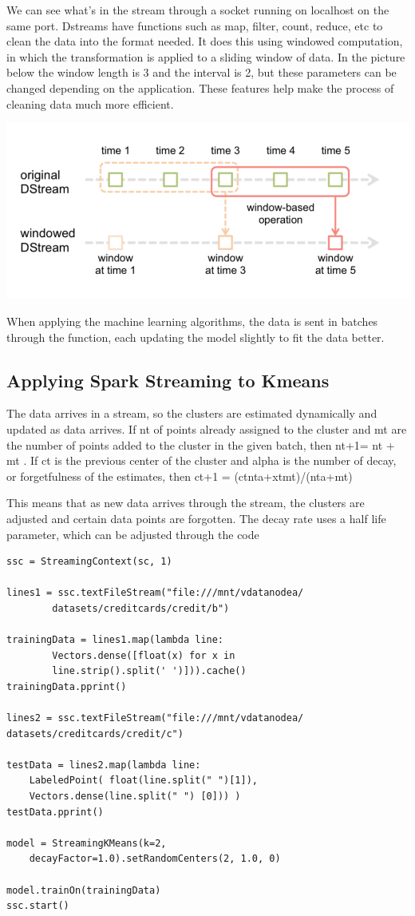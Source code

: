 \documentclass[9pt,twocolumn,twoside]{idsi}
\begin{document}
We can see what's in the stream  through a socket running on localhost on the same port. Dstreams have functions such as map, filter, count, reduce, etc to clean the data into the format needed. It does this using windowed computation, in which the transformation is applied to a sliding window of data. In the picture below the window length is 3 and the interval is 2, but these parameters can be changed depending on the application. These features help make the process of cleaning data much more efficient. 

\includegraphics[scale=0.5]{one.png}

When applying the machine learning algorithms, the data is sent in batches through the function, each updating the model slightly to fit the data better. 


\subsection{Applying Spark Streaming to Kmeans} 

The data arrives in a stream, so the clusters are estimated dynamically and updated as data arrives. If nt  of points already assigned to the cluster and mt  are the number of points added to the cluster in the given batch, then nt+1= nt + mt  . If ct  is the previous center of the cluster and alpha is the number of decay, or forgetfulness of the estimates, then ct+1 = (ctnta+xtmt)/(nta+mt)

This means that as new data arrives through the stream, the clusters are adjusted and certain data points are forgotten. The decay rate uses a half life parameter, which can be adjusted through the code

\begin{verbatim}
ssc = StreamingContext(sc, 1)

lines1 = ssc.textFileStream("file:///mnt/vdatanodea/
		datasets/creditcards/credit/b")
        
trainingData = lines1.map(lambda line: 
		Vectors.dense([float(x) for x in 
    	line.strip().split(' ')])).cache()
trainingData.pprint()

lines2 = ssc.textFileStream("file:///mnt/vdatanodea/
datasets/creditcards/credit/c")

testData = lines2.map(lambda line: 
	LabeledPoint( float(line.split(" ")[1]), 
	Vectors.dense(line.split(" ") [0])) )
testData.pprint()

model = StreamingKMeans(k=2, 
	decayFactor=1.0).setRandomCenters(2, 1.0, 0)

model.trainOn(trainingData)
ssc.start()
\end{verbatim}
\end{document}
